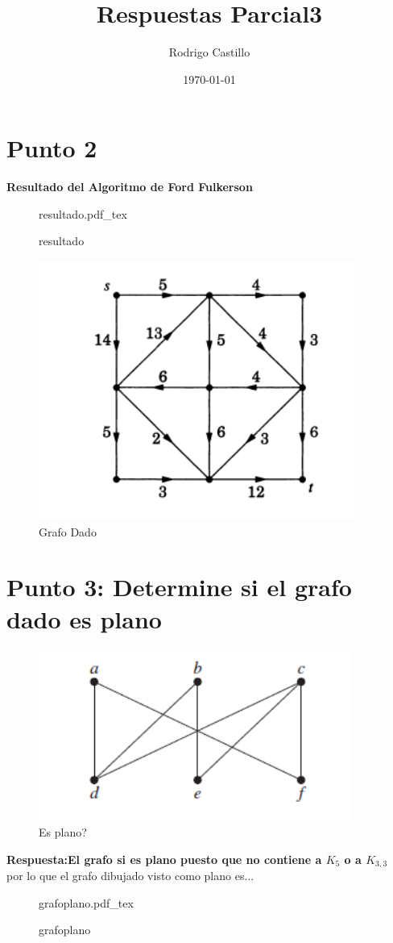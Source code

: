 \documentclass[10pt,a4paper]{article} %
\newcommand{\incfig}[1]{%
    \def\svgwidth{\columnwidth}
    {#1.pdf_tex}
}
\begin{document}
    \title{{  Respuestas Parcial3  }}
    \author{{Rodrigo Castillo}}
    \date{\today}

    \maketitle


    \section{Punto 2}
    \textbf{Resultado del Algoritmo de Ford Fulkerson}
\begin{figure}[ht]
    \centering
    \incfig{resultado}
    \caption{resultado}
    \label{fig:resultado}
\end{figure}

    \begin{figure}[h!]
        \centering
        \includegraphics[width=0.4\linewidth]{grafodado.png}
        \caption{Grafo Dado}
        \label{fig}
    \end{figure}


    \newpage
    \section{Punto 3: Determine si el grafo dado es plano }
    \begin{figure}[h!]
        \centering
        \includegraphics[width=0.4\linewidth]{plano.png}
        \caption{Es plano?}
        \label{fig}
    \end{figure}
    \textbf{Respuesta:El grafo si es plano puesto que no contiene a $K_5$ o a $K_{3,3}$}
    \\
    por lo que el grafo dibujado visto como plano es...
    \\
    \begin{figure}[ht]
        \centering
        \incfig{grafoplano}
        \caption{grafoplano}
        \label{fig:grafoplano}
    \end{figure}
\end{document}
